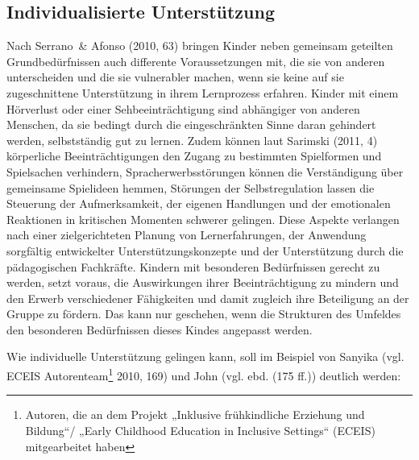 \subsection{Individualisierte Unterstützung} 
\label{Individualisierung}
Nach Serrano~\& Afonso (2010, 63) bringen Kinder neben gemeinsam geteilten Grundbedürfnissen auch differente Voraussetzungen mit, die sie von anderen unterscheiden und die sie vulnerabler machen, wenn sie keine auf sie zugeschnittene Unterstützung in ihrem Lernprozess erfahren. Kinder mit einem Hörverlust oder einer Sehbeeinträchtigung sind abhängiger von anderen Menschen, da sie bedingt durch die eingeschränkten Sinne daran gehindert werden, selbstständig gut zu lernen. Zudem können laut Sarimski (2011, 4) körperliche Beeinträchtigungen den Zugang zu bestimmten Spielformen und Spielsachen verhindern, Spracherwerbsstörungen können die Verständigung über gemeinsame Spielideen hemmen, Störungen der Selbstregulation lassen die Steuerung der Aufmerksamkeit, der eigenen Handlungen und der emotionalen Reaktionen in kritischen Momenten schwerer gelingen.    
Diese Aspekte verlangen nach einer zielgerichteten Planung von Lernerfahrungen, der Anwendung sorgfältig entwickelter Unterstützungskonzepte und der Unterstützung durch die pädagogischen Fachkräfte. Kindern mit besonderen Bedürfnissen gerecht zu werden, setzt voraus, die Auswirkungen ihrer Beeinträchtigung zu mindern und den Erwerb verschiedener Fähigkeiten und damit zugleich ihre Beteiligung an der Gruppe zu fördern. Das kann nur geschehen, wenn die Strukturen des Umfeldes den besonderen Bedürfnissen dieses Kindes angepasst werden. 

Wie individuelle Unterstützung gelingen kann, soll im Beispiel von Sanyika (vgl. ECEIS Autorenteam\footnote{Autoren, die an dem Projekt „Inklusive frühkindliche Erziehung und Bildung“/ „Early Childhood Education in Inclusive Settings“ (ECEIS) mitgearbeitet haben} 2010, 169) und John (vgl. ebd. (175 ff.)) deutlich werden:

